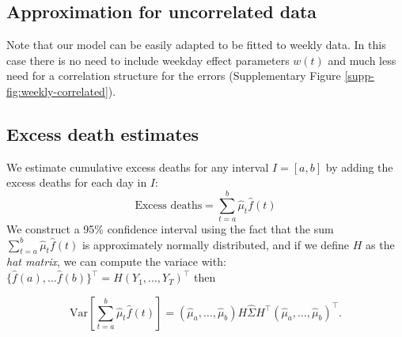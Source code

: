 \documentclass[11pt]{article}
\begin{document}
\subsection{Approximation for uncorrelated data}
Note that our model can be easily adapted to be fitted to weekly data. In this case there is no need to include weekday effect parameters $w(t)$ and much less need for a correlation structure for the errors (Supplementary Figure \ref{supp-fig:weekly-correlated}). 

\subsection{Excess death estimates}
\label{subsec:excess-deaths}
We estimate cumulative excess deaths for any interval $I = [a, b]$ 
by adding the excess deaths for each day
in $I$: 
\begin{equation*}
    \mbox{Excess deaths} = \sum_{t = a}^b \hat{\mu}_t \hat{f}(t) 
\end{equation*}
We construct a 95\% confidence interval using the fact that the sum $\sum_{t = a}^b \hat{\mu}_t \hat{f}(t)$ is approximately normally distributed, and if we define $H$ as the \emph{hat matrix}, we can compute the variace with:
$\{ \hat{f}(a), \dots \hat{f}(b) \}^\top = H (Y_1, \dots, Y_T)^\top$ then

 \begin{equation*}
    \mbox{Var}\left[\sum_{t = a}^b \hat{\mu}_t \hat{f}(t) \right] = (\hat{\mu}_a,\dots,\hat{\mu}_b) H \hat{\Sigma} H^\top (\hat{\mu}_a,\dots,\hat{\mu}_b)^\top.
 \end{equation*}
 
\end{document}
